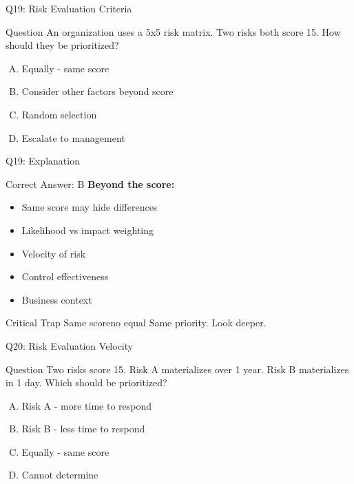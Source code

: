 \documentclass{beamer}
\begin{document}
			\begin{frame}{Q19: Risk Evaluation Criteria}
				\begin{block}{Question}
					An organization uses a 5x5 risk matrix. Two risks both score 15. How should they be prioritized?
				\end{block}
				\begin{enumerate}[(A)]
					\item Equally - same score
					\item Consider other factors beyond score
					\item Random selection
					\item Escalate to management
				\end{enumerate}
			\end{frame}
			
			\begin{frame}{Q19: Explanation}
				\begin{block}{Correct Answer: B}
					\textbf{Beyond the score:}
					\begin{itemize}
						\item Same score may hide differences
						\item Likelihood vs impact weighting
						\item Velocity of risk
						\item Control effectiveness
						\item Business context
					\end{itemize}
				\end{block}
				\begin{alertblock}{Critical Trap}
					Same scoreno equal Same priority. Look deeper.
				\end{alertblock}
			\end{frame}
			
			\begin{frame}{Q20: Risk Evaluation Velocity}
				\begin{block}{Question}
					Two risks score 15. Risk A materializes over 1 year. Risk B materializes in 1 day. Which should be prioritized?
				\end{block}
				\begin{enumerate}[(A)]
					\item Risk A - more time to respond
					\item Risk B - less time to respond
					\item Equally - same score
					\item Cannot determine
				\end{enumerate}
			\end{frame}
			
\end{document}

